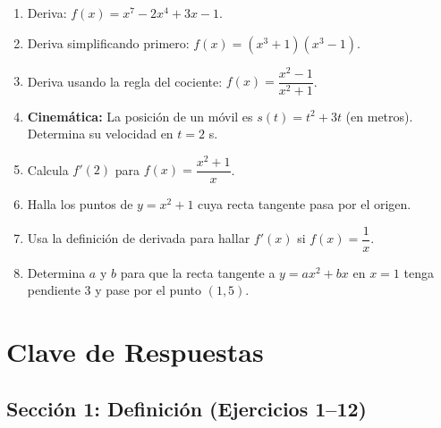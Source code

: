\documentclass[12pt, letterpaper]{article}
\begin{document}
\begin{enumerate}[resume=ejercicios, leftmargin=*]
  \item \facil{} Deriva: $f(x) = x^7 - 2x^4 + 3x - 1$.

  \item \medio{} Deriva simplificando primero: $f(x) = (x^3 + 1)(x^3 - 1)$.

  \item \medio{} Deriva usando la regla del cociente: $f(x) = \dfrac{x^2 - 1}{x^2 + 1}$.

  \item \medio{} \textbf{Cinemática:} La posición de un móvil es $s(t) = t^2 + 3t$ (en metros). Determina su velocidad en $t = 2$ s.

  \item \dificil{} Calcula $f'(2)$ para $f(x) = \dfrac{x^2 + 1}{x}$.

  \item \dificil{} Halla los puntos de $y = x^2 + 1$ cuya recta tangente pasa por el origen.

  \item \muyDificil{} Usa la definición de derivada para hallar $f'(x)$ si $f(x) = \dfrac{1}{x}$.

  \item \muyDificil{} Determina $a$ y $b$ para que la recta tangente a $y = ax^2 + bx$ en $x = 1$ tenga pendiente 3 y pase por el punto $(1, 5)$.
\end{enumerate}
\newpage
\ifmwclaves
\section{Clave de Respuestas}

\subsection*{Sección 1: Definición (Ejercicios 1--12)}
\end{document}
